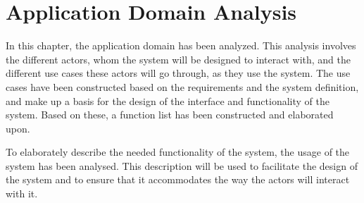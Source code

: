 \chapter{Application Domain Analysis} \label{ch:applicationdomain}
In this chapter, the application domain has been analyzed. This analysis involves the different actors, whom the system will be designed to interact with, and the different use cases these actors will go through, as they use the system. The use cases have been constructed based on the requirements and the system definition, and make up a basis for the design of the interface and functionality of the system. Based on these, a function list has been constructed and elaborated upon.
\par
To elaborately describe the needed functionality of the system, the usage of the system has been analysed. This description will be used to facilitate the design of the system and to ensure that it accommodates the way the actors will interact with it.